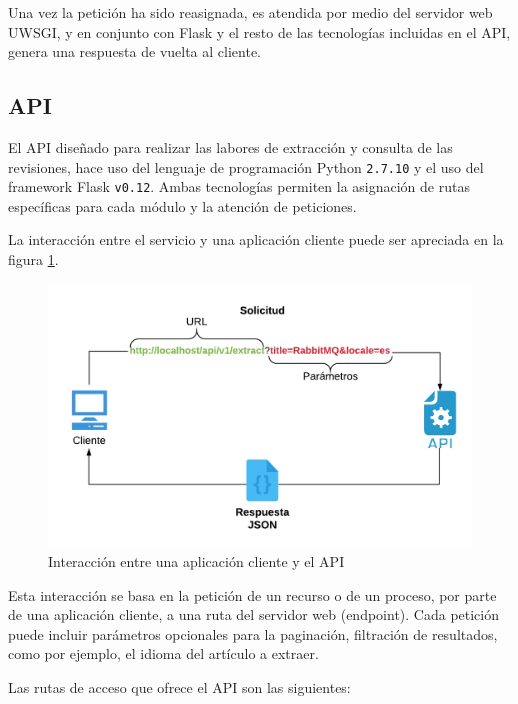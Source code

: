 Una vez la petición ha sido reasignada, es atendida por medio del servidor web UWSGI, y en conjunto
con Flask y el resto de las tecnologías incluidas en el API, genera una respuesta de vuelta al cliente.

\subsection{API}

El API diseñado para realizar las labores de extracción y consulta de las revisiones, hace uso del lenguaje de programación Python \texttt{2.7.10} y el uso del framework Flask \texttt{v0.12}.
Ambas tecnologías permiten la asignación de rutas específicas para cada módulo
y la atención de peticiones.

La interacción entre el servicio y una aplicación cliente puede ser apreciada en la figura \ref{fig:diagram_api_1}.

\begin{figure}[H]
	\centering
		\includegraphics[width=1\textwidth]{figures/diagram_api_1}
	\caption{Interacción entre una aplicación cliente y el API}
	\label{fig:diagram_api_1}
\end{figure}

Esta interacción se basa en la petición de un recurso o de un proceso, por parte de una aplicación cliente, a una ruta del servidor web (endpoint).
Cada petición puede incluir parámetros opcionales para la paginación, filtración de resultados, como por ejemplo, el idioma del artículo a extraer.

Las rutas de acceso que ofrece el API son las siguientes:

